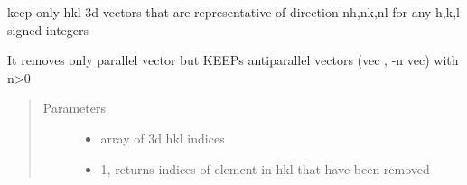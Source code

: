 \documentclass[letterpaper,10pt,english]{sphinxmanual}
\begin{document}
\begin{fulllineitems}
\label{\detokenize{Simulation_Module:LaueTools.CrystalParameters.FilterHarmonics_2}}
keep only hkl 3d vectors that are representative of direction nh,nk,nl
for any h,k,l signed integers

It removes only parallel vector but KEEPs antiparallel vectors (vec , -n vec) with n\textgreater{}0
\begin{quote}\begin{description}
\item[{Parameters}] \leavevmode\begin{itemize}
\item {} 
 \textendash{} array of 3d hkl indices

\item {} 
 \textendash{} 1, returns indices of element in hkl that have been removed

\end{itemize}

\end{description}\end{quote}

\end{fulllineitems}

\end{document}
